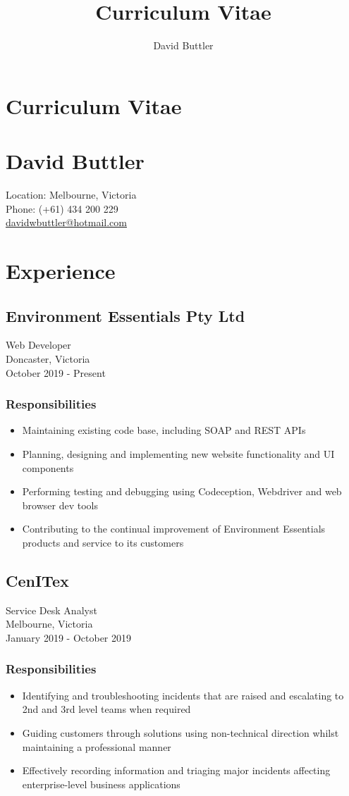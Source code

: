 \documentclass[a4paper, 12pt]{article}
\title{Curriculum Vitae}
\author{David Buttler}
\begin{document}
	\begin{center}
	\section*{Curriculum Vitae}	
	\section*{David Buttler}
		Location: Melbourne, Victoria\\
		Phone: (+61) 434 200 229\\
		\href{mailto:davidwbuttler@hotmail.com}{davidwbuttler@hotmail.com}
	\end{center}
	\section*{Experience}
	\subsection*{Environment Essentials Pty Ltd}
		Web Developer\\
		Doncaster, Victoria\\
		October 2019 - Present
	\subsubsection*{Responsibilities}
	\begin{itemize}
		\item Maintaining existing code base, including SOAP and REST APIs
		\item Planning, designing and implementing new website functionality and UI components
		\item Performing testing and debugging using Codeception, Webdriver and web browser dev tools
		\item Contributing to the continual improvement of Environment Essentials products and service to its customers
	\end{itemize}
	\subsection*{CenITex}
		Service Desk Analyst\\
		Melbourne, Victoria\\
		January 2019 - October 2019
	\subsubsection*{Responsibilities}
	\begin{itemize}
		\item Identifying and troubleshooting incidents that are raised and escalating to 2nd and 3rd level teams when required
		\item Guiding customers through solutions using non-technical direction whilst maintaining a professional manner
		\item Effectively recording information and triaging major incidents affecting enterprise-level business applications 
	\end{itemize}
\end{document}

